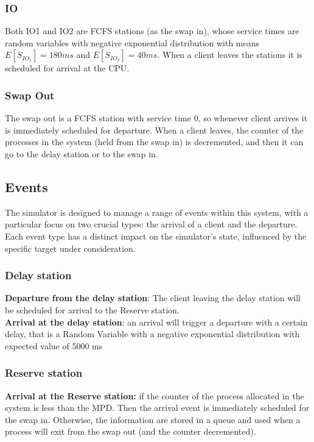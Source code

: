 \documentclass[12pt,a4paper]{article}
\begin{document}
\subsubsection{IO}

Both IO1 and IO2 are FCFS stations (as the swap in), whose service times are random variables with negative exponential distribution with means $E[S_{IO_1}] = 180ms$ and $E[S_{IO_2}]= 40ms$. When a client leaves the stations it is scheduled for arrival at the CPU.

\subsubsection{Swap Out}
The swap out is a FCFS station with service time 0, so whenever client arrives it is immediately scheduled for departure. When a client leaves, the counter of the processes in the system (held from the swap in) is decremented, and then it can go to the delay station or to the swap in.

\subsection{Events}
The simulator is designed to manage a range of events within this system, with a particular focus on two crucial types: the arrival of a client and the departure. Each event type has a distinct impact on the simulator's state, influenced by the specific target under consideration.
\subsubsection{Delay station}

\textbf{Departure from the delay station}: The client leaving the delay station will be scheduled for arrival to the Reserve station.
\\
\textbf{Arrival at the delay station}:
an arrival will trigger a departure with a certain delay, that is a Random Variable with a negative exponential distribution with expected value of 5000 ms
\\
\subsubsection{Reserve station}
\textbf{Arrival at the Reserve station:} if the counter of the process allocated in the system is less than the MPD. Then the  arrival event is immediately scheduled for the swap in. Otherwise, the information are stored in a queue and used when a process will exit from the swap out (and the counter decremented).
\end{document}
